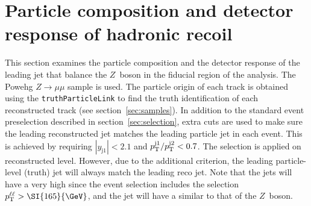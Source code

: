 \section{Particle composition and detector response of hadronic recoil}

This section examines the particle composition and the detector response of the leading jet that balance the $Z$~boson in the fiducial region of the analysis. 
The Powehg $Z\to \mu\mu$ sample is used. The particle origin of each track is obtained using the \texttt{truthParticleLink} to find the truth identification of each reconstructed track (see section~\ref{sec:samples}). In addition to the standard event preselection described in section~\ref{sec:selection}, extra cuts are used to make sure the leading reconstructed jet matches the leading particle jet in each event. 
This is achieved by requiring $|y_\mathrm{j1}|<2.1$ and $p_\mathrm{T}^{\mathrm{j1}} / p_\mathrm{T}^{\mathrm{j2}} < 0.7$. The selection is applied on reconstructed level. However, due to the additional criterion, the leading particle-level (truth) jet will always match the leading reco jet. Note that the jets will have a very high \pt{} since the event selection includes the selection $\pTll > \SI{165}{\GeV}$, and the jet will have a similar \pt{} to that of the $Z$~boson.




